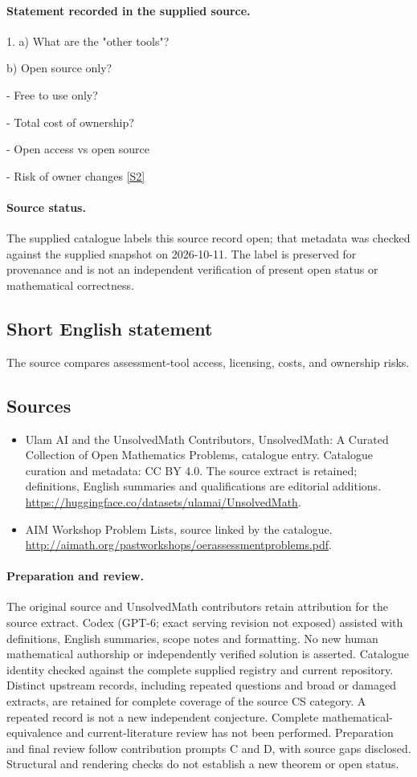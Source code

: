 \documentclass[11pt]{article}
\begin{document}
\paragraph{Statement recorded in the supplied source.}
1. a) What are the "other tools"?

b) Open source only?

- Free to use only?

- Total cost of ownership?

- Open access vs open source

- Risk of owner changes \href{http://aimath.org/pastworkshops/oerassessmentproblems.pdf}{[S2]}
\paragraph{Source status.}
The supplied catalogue labels this source record open; that metadata was checked against the supplied snapshot on 2026-10-11. The label is preserved for provenance and is not an independent verification of present open status or mathematical correctness.
\subsection{Short English statement}
The source compares assessment-tool access, licensing, costs, and ownership risks.
\subsection{Sources}
\begin{itemize}
\item[S1] Ulam AI and the UnsolvedMath Contributors, UnsolvedMath: A Curated Collection of Open Mathematics Problems, catalogue entry. Catalogue curation and metadata: CC BY 4.0. The source extract is retained; definitions, English summaries and qualifications are editorial additions.
\url{https://huggingface.co/datasets/ulamai/UnsolvedMath}.
\item[S2] AIM Workshop Problem Lists, source linked by the catalogue.
\url{http://aimath.org/pastworkshops/oerassessmentproblems.pdf}.
\end{itemize}
\paragraph{Preparation and review.}
The original source and UnsolvedMath contributors retain attribution for the source extract. Codex (GPT-6; exact serving revision not exposed) assisted with definitions, English summaries, scope notes and formatting. No new human mathematical authorship or independently verified solution is asserted. Catalogue identity checked against the complete supplied registry and current repository. Distinct upstream records, including repeated questions and broad or damaged extracts, are retained for complete coverage of the source CS category. A repeated record is not a new independent conjecture. Complete mathematical-equivalence and current-literature review has not been performed. Preparation and final review follow contribution prompts C and D, with source gaps disclosed. Structural and rendering checks do not establish a new theorem or open status.
\label{end:statement}
\end{document}

